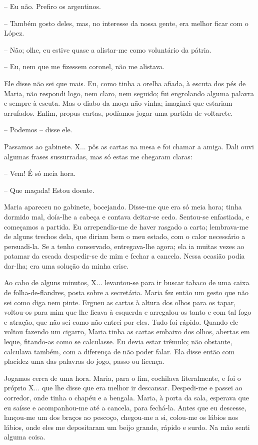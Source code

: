 -- Eu não. Prefiro os argentinos.

-- Também gosto deles, mas, no interesse da nossa gente, era melhor
ficar com o López.

-- Não; olhe, eu estive quase a alistar-me como voluntário da pátria.

-- Eu, nem que me fizessem coronel, não me alistava.

Ele disse não sei que mais. Eu, como tinha a orelha afiada, à escuta dos
pés de Maria, não respondi logo, nem claro, nem seguido; fui engrolando
alguma palavra e sempre à escuta. Mas o diabo da moça não vinha;
imaginei que estariam arrufados. Enfim, propus cartas, podíamos jogar
uma partida de voltarete.

-- Podemos -- disse ele.

Passamos ao gabinete. X... pôs as cartas na mesa e foi chamar a amiga.
Dali ouvi algumas frases sussurradas, mas só estas me chegaram claras:

-- Vem! É só meia hora.

-- Que maçada! Estou doente.

Maria apareceu no gabinete, bocejando. Disse-me que era só meia hora;
tinha dormido mal, doía-lhe a cabeça e contava deitar-se cedo. Sentou-se
enfastiada, e começamos a partida. Eu arrependia-me de haver rasgado a
carta; lembrava-me de alguns trechos dela, que diriam bem o meu estado,
com o calor necessário a persuadi-la. Se a tenho conservado,
entregava-lhe agora; ela ia muitas vezes ao patamar da escada
despedir-se de mim e fechar a cancela. Nessa ocasião podia dar-lha; era
uma solução da minha crise.

Ao cabo de alguns minutos, X... levantou-se para ir buscar tabaco de uma
caixa de folha-de-flandres, posta sobre a secretária. Maria fez então um
gesto que não sei como diga nem pinte. Ergueu as cartas à altura dos
olhos para os tapar, voltou-os para mim que lhe ficava à esquerda e
arregalou-os tanto e com tal fogo e atração, que não sei como não entrei
por eles. Tudo foi rápido. Quando ele voltou fazendo um cigarro, Maria
tinha as cartas embaixo dos olhos, abertas em leque, fitando-as como se
calculasse. Eu devia estar trêmulo; não obstante, calculava também, com
a diferença de não poder falar. Ela disse então com placidez uma das
palavras do jogo, passo ou licença.

Jogamos cerca de uma hora. Maria, para o fim, cochilava literalmente, e
foi o próprio X... que lhe disse que era melhor ir descansar. Despedi-me
e passei ao corredor, onde tinha o chapéu e a bengala. Maria, à porta da
sala, esperava que eu saísse e acompanhou-me até a cancela, para
fechá-la. Antes que eu descesse, lançou-me um dos braços ao pescoço,
chegou-me a si, colou-me os lábios nos lábios, onde eles me depositaram
um beijo grande, rápido e surdo. Na mão senti alguma coisa.

